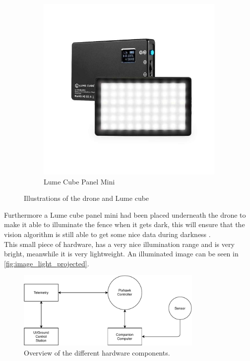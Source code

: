 \documentclass[../Head/Main.tex]{subfiles}
\begin{document}
\begin{figure}[H]
\begin{subfigure}[t]{.45\textwidth}
        \includegraphics[width=\textwidth]{../Figures/panel-mini-back-front_600x.jpg}
        \caption{Lume Cube Panel Mini \cite{Lume_cube_mini}}
        \label{fig:fig:lume_cube_panel_mini}
    \end{subfigure}
    \caption{Illustrations of the drone and Lume cube}
\end{figure}

Furthermore a Lume cube panel mini had been placed underneath the drone to make it able to illuminate the fence when it gets dark, this will ensure that the vision algorithm is still able to get some nice data during darkness \cite{Lume_cube_mini}.\\
This small piece of hardware, has a very nice illumination range and is very bright, meanwhile it is very lightweight. An illuminated image can be seen in \autoref{fig:image_light_projected}.

\begin{figure}[H]
    \centering
    \includegraphics[width=0.8\textwidth]{../Figures/hardware_overview.pdf}
    \caption{Overview of the different hardware components.}
    \label{fig:hardware_overview}
\end{figure}
\end{document}
